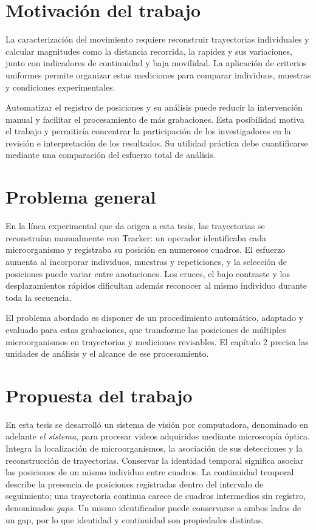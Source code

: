 \section{Motivación del trabajo}

La caracterización del movimiento requiere reconstruir trayectorias individuales y calcular magnitudes como la distancia recorrida, la rapidez y sus variaciones, junto con indicadores de continuidad y baja movilidad. La aplicación de criterios uniformes permite organizar estas mediciones para comparar individuos, muestras y condiciones experimentales.

Automatizar el registro de posiciones y su análisis puede reducir la intervención manual y facilitar el procesamiento de más grabaciones. Esta posibilidad motiva el trabajo y permitiría concentrar la participación de los investigadores en la revisión e interpretación de los resultados. Su utilidad práctica debe cuantificarse mediante una comparación del esfuerzo total de análisis.

\section{Problema general}

En la línea experimental que da origen a esta tesis, las trayectorias se reconstruían manualmente con Tracker: un operador identificaba cada microorganismo y registraba su posición en numerosos cuadros. El esfuerzo aumenta al incorporar individuos, muestras y repeticiones, y la selección de posiciones puede variar entre anotaciones. Los cruces, el bajo contraste y los desplazamientos rápidos dificultan además reconocer al mismo individuo durante toda la secuencia.

El problema abordado es disponer de un procedimiento automático, adaptado y evaluado para estas grabaciones, que transforme las posiciones de múltiples microorganismos en trayectorias y mediciones revisables. El capítulo 2 precisa las unidades de análisis y el alcance de ese procesamiento.

\section{Propuesta del trabajo}

En esta tesis se desarrolló un sistema de visión por computadora, denominado en adelante \emph{el sistema}, para procesar videos adquiridos mediante microscopía óptica. Integra la localización de microorganismos, la asociación de sus detecciones y la reconstrucción de trayectorias. Conservar la identidad temporal significa asociar las posiciones de un mismo individuo entre cuadros. La continuidad temporal describe la presencia de posiciones registradas dentro del intervalo de seguimiento; una trayectoria continua carece de cuadros intermedios sin registro, denominados \emph{gaps}. Un mismo identificador puede conservarse a ambos lados de un gap, por lo que identidad y continuidad son propiedades distintas.

